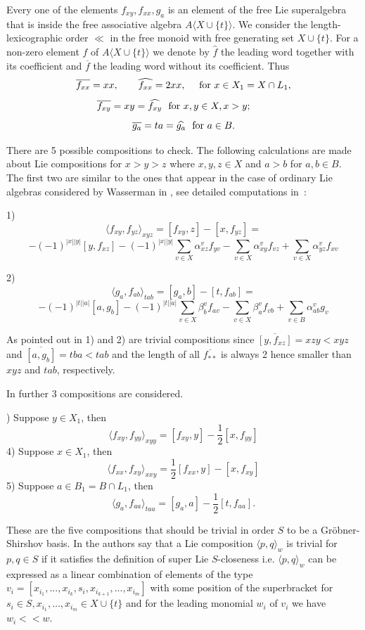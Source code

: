 \documentclass[12pt, reqno]{amsart}
\theoremstyle{remark}
\theoremstyle{definition}
\numberwithin{equation}{section}
\begin{document}
\noindent
 Every one of the elements $f_{xy}, f_{xx}, g_a$ is an element of the free Lie superalgebra  that is inside the free 
 associative algebra $A \langle X \cup \{ t \} \rangle$. We consider the
 length-lexicographic order $\ll $ in the free monoid with free  generating set $X \cup \{ t \}$. 
 For a non-zero element $f$  of  $A \langle X \cup \{ t \} \rangle$ we denote by $\widehat{f}$  the leading word together with its coefficient and $\overline{f}$ the leading  word without its coefficient. Thus
 $$\overline{f_{xx}} = xx,\qquad \widehat{f_{xx}} = 2xx,\quad \hbox{ for } x \in X_1 = X \cap L_1,$$
 $$\overline{f_{xy}} = xy = \widehat{f_{xy}}\ \hbox{ for } x,y \in X, x > y; \qquad$$
 $$ \overline{g_a} = ta = \widehat{g_a}\ \hbox{ for } a \in B.$$


There are 5 possible compositions to check.   The following calculations are made about Lie compositions for $x > y > z$ where $x,y,z \in X$ and $ a > b$ for $a,b \in B$. 
The first two are similar to the ones that appear in the case of ordinary Lie algebras  considered by Wasserman in \cite{W}, see detailed computations in~\cite{L-P-Z}:

  1) $$\langle f_{xy}, f_{yz} \rangle_{xyz} = [f_{xy},z] - [x, f_{yz}] =$$ $$ - (-1)^{|x| |y|} [y, f_{xz}]  - (-1)^{|x| |y|}  \sum_{v \in X} \alpha_{xz}^v f_{yv} - \sum_{v \in X} \alpha_{xy}^v f_{vz} + \sum_{v \in X} \alpha_{yz}^v f_{xv}$$
  
  2) $$\langle g_a, f_{ab} \rangle_{tab} = [g_a, b] - [t, f_{ab}] =$$ $$ - (-1)^{|t| |a|} [a, g_b]   - (-1)^{|t| |a|} \sum_{v \in X} \beta_b^v f_{av} - \sum_{v \in X} \beta_a^v f_{vb} + \sum_{v \in B} \alpha_{ab}^v  g_v
  $$

 As pointed out in \cite{L-P-Z} 1) and 2) are trivial compositions since  $\overline{[y, f_{xz}]} = {xzy} < xyz$ and  $\overline{ [a, g_b]} = tba < t a b$ and the length of all $\overline{f_{**}}$ is always 2 hence smaller than $xyz$ and $tab$, respectively.

  In \cite{L-P-Z} further 3 compositions are considered. 
  

) Suppose $y \in X_1$, then
 $$\langle f_{xy}, f_{yy}\rangle_{xyy} = [f_{xy},y] - \frac{1}{2} [x,  f_{yy}]    $$ 
4) Suppose $x \in X_1$, then  $$\langle f_{xx}, f_{xy} \rangle_{xxy} =  \frac{1}{2}[f_{xx},y] - [x, f_{xy}]$$
5) Suppose $a \in B_1 = B \cap L_1 $, then $$\langle g_a, f_{aa} \rangle_{taa} =[g_a, a]- \frac{1}{2}[t, f_{aa}].$$
 
 
 These are the five compositions that should be trivial in order $S$ to be a Gr\"obner-Shirshov basis. In  \cite{L-P-Z} the authors say that a Lie composition $\langle p, q \rangle_w$ is trivial for $p,q \in S$ if it satisfies the definition of super Lie $S$-closeness i.e.
  $\langle p, q \rangle_w$ can be expressed as a linear combination of elements  of the type $v_i = [ x_{i_1}, ..., x_{i_k}, s_i, x_{i_{k+1}}, ..., x_{i_m}]$ with some position of the superbracket for $s_i \in S, x_{i_1}, \ldots, x_{i_m} \in X \cup \{ t \}$ and  for the leading monomial  $w_i$ of $v_i$ we have $w_i < < w$.
 
\end{document}
